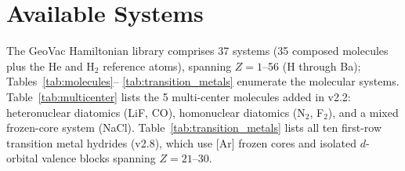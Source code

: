 \documentclass[twocolumn,pra,amsmath,amssymb,superscriptaddress]{revtex4-2}
\begin{document}
\section{Available Systems}
\label{sec:systems}

The GeoVac Hamiltonian library comprises 37 systems (35 composed
molecules plus the He and H$_2$ reference atoms), spanning
$Z = 1$--56 (H through Ba); Tables~\ref{tab:molecules}--%
\ref{tab:transition_metals} enumerate the molecular systems.
Table~\ref{tab:multicenter} lists the 5 multi-center molecules added
in v2.2: heteronuclear diatomics (LiF, CO), homonuclear
diatomics (N$_2$, F$_2$), and a mixed frozen-core system (NaCl).
Table~\ref{tab:transition_metals} lists all ten first-row transition metal
hydrides (v2.8), which use [Ar] frozen cores and isolated
$d$-orbital valence blocks spanning $Z = 21$--30.
\end{document}
